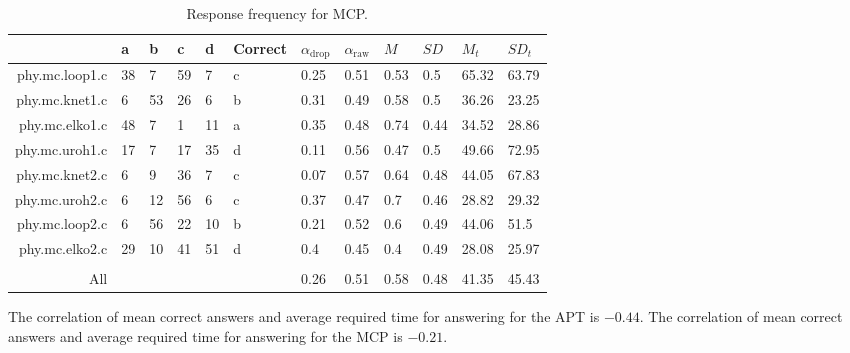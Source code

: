 \documentclass[C:/Users/sunpn505/Documents/studies/WinnerS/Erhebungen/IPhO1718/paper/problem_solving/main/main]{subfiles}
\begin{document}
\begin{table}
\caption{Response frequency for MCP.}
\label{MCPdescriptives}
\begin{tabular}{rlllllllllll}
  \toprule
 & a & b & c & d & Correct & $\alpha_{\text{drop}}$ & $\alpha_{\text{raw}}$ & $M$ & $SD$ & $M_t$ & $SD_t$ \\ 
  \midrule
phy.mc.loop1.c & 38 & 7 & 59 & 7 & c & 0.25 & 0.51 & 0.53 & 0.5 & 65.32 & 63.79 \\ 
  phy.mc.knet1.c & 6 & 53 & 26 & 6 & b & 0.31 & 0.49 & 0.58 & 0.5 & 36.26 & 23.25 \\ 
  phy.mc.elko1.c & 48 & 7 & 1 & 11 & a & 0.35 & 0.48 & 0.74 & 0.44 & 34.52 & 28.86 \\ 
  phy.mc.uroh1.c & 17 & 7 & 17 & 35 & d & 0.11 & 0.56 & 0.47 & 0.5 & 49.66 & 72.95 \\ 
  phy.mc.knet2.c & 6 & 9 & 36 & 7 & c & 0.07 & 0.57 & 0.64 & 0.48 & 44.05 & 67.83 \\ 
  phy.mc.uroh2.c & 6 & 12 & 56 & 6 & c & 0.37 & 0.47 & 0.7 & 0.46 & 28.82 & 29.32 \\ 
  phy.mc.loop2.c & 6 & 56 & 22 & 10 & b & 0.21 & 0.52 & 0.6 & 0.49 & 44.06 & 51.5 \\ 
  phy.mc.elko2.c & 29 & 10 & 41 & 51 & d & 0.4 & 0.45 & 0.4 & 0.49 & 28.08 & 25.97 \\ 
   &  &  &  &  &  &  &  &  &  &  &  \\ 
  All &  &  &  &  &  & 0.26 & 0.51 & 0.58 & 0.48 & 41.35 & 45.43 \\ 
   \bottomrule
\end{tabular}\end{table}

The correlation of mean correct answers and average required time for answering for the APT is $-0.44$. The correlation of mean correct answers and average required time for answering for the MCP is $-0.21$.


\end{document}
